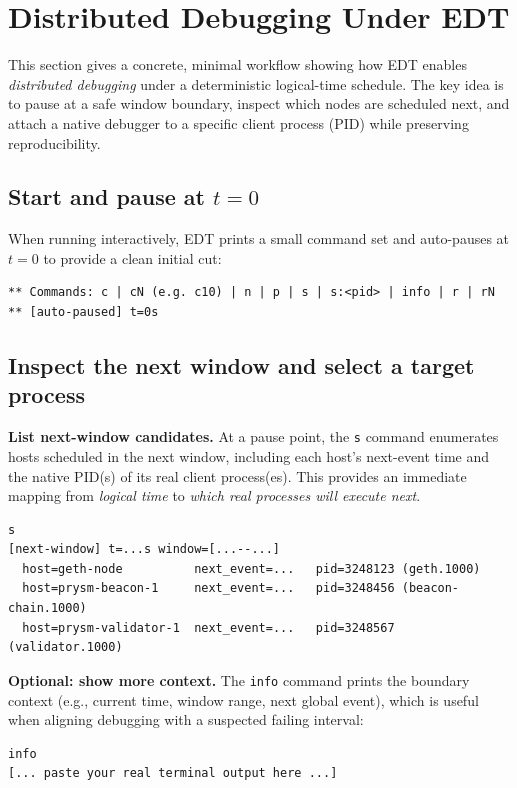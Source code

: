 \section{Distributed Debugging Under EDT}
\label{sec:edt-debug-case}
This section gives a concrete, minimal workflow showing how EDT enables
\emph{distributed debugging} under a deterministic logical-time schedule. The key
idea is to pause at a safe window boundary, inspect which nodes are scheduled
next, and attach a native debugger to a specific client process (PID) while
preserving reproducibility.

\subsection{Start and pause at \(t=0\)}
When running interactively, EDT prints a small command set and auto-pauses at
\(t=0\) to provide a clean initial cut:

\begin{verbatim}
** Commands: c | cN (e.g. c10) | n | p | s | s:<pid> | info | r | rN
** [auto-paused] t=0s
\end{verbatim}

\subsection{Inspect the next window and select a target process}
\noindent\textbf{List next-window candidates.}
At a pause point, the \texttt{s} command enumerates hosts scheduled in the next
window, including each host's next-event time and the native PID(s) of its real
client process(es). This provides an immediate mapping from \emph{logical time}
to \emph{which real processes will execute next}.

\begin{verbatim}
s
[next-window] t=...s window=[...--...]
  host=geth-node          next_event=...   pid=3248123 (geth.1000)
  host=prysm-beacon-1     next_event=...   pid=3248456 (beacon-chain.1000)
  host=prysm-validator-1  next_event=...   pid=3248567 (validator.1000)
\end{verbatim}

\noindent\textbf{Optional: show more context.}
The \texttt{info} command prints the boundary context (e.g., current time,
window range, next global event), which is useful when aligning debugging with a
suspected failing interval:

\begin{verbatim}
info
[... paste your real terminal output here ...]
\end{verbatim}

